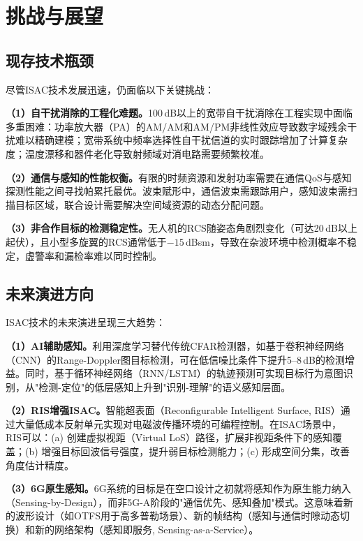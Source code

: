 \section{挑战与展望}

\subsection{现存技术瓶颈}

尽管ISAC技术发展迅速，仍面临以下关键挑战：

\textbf{（1）自干扰消除的工程化难题。}100\,dB以上的宽带自干扰消除在工程实现中面临多重困难：功率放大器（PA）的AM/AM和AM/PM非线性效应导致数字域残余干扰难以精确建模；宽带系统中频率选择性自干扰信道的实时跟踪增加了计算复杂度；温度漂移和器件老化导致射频域对消电路需要频繁校准。

\textbf{（2）通信与感知的性能权衡。}有限的时频资源和发射功率需要在通信QoS与感知探测性能之间寻找帕累托最优。波束赋形中，通信波束需跟踪用户，感知波束需扫描目标区域，联合设计需要解决空间域资源的动态分配问题。

\textbf{（3）非合作目标的检测稳定性。}无人机的RCS随姿态角剧烈变化（可达20\,dB以上起伏），且小型多旋翼的RCS通常低于$-15$\,dBsm，导致在杂波环境中检测概率不稳定，虚警率和漏检率难以同时控制。

\subsection{未来演进方向}

ISAC技术的未来演进呈现三大趋势：

\textbf{（1）AI辅助感知。}利用深度学习替代传统CFAR检测器，如基于卷积神经网络（CNN）的Range-Doppler图目标检测，可在低信噪比条件下提升5--8\,dB的检测增益。同时，基于循环神经网络（RNN/LSTM）的轨迹预测可实现目标行为意图识别，从"检测-定位"的低层感知上升到"识别-理解"的语义感知层面。

\textbf{（2）RIS增强ISAC。}智能超表面（Reconfigurable Intelligent Surface, RIS）通过大量低成本反射单元实现对电磁波传播环境的可编程控制。在ISAC场景中，RIS可以：(a) 创建虚拟视距（Virtual LoS）路径，扩展非视距条件下的感知覆盖；(b) 增强目标回波信号强度，提升弱目标检测能力；(c) 形成空间分集，改善角度估计精度。

\textbf{（3）6G原生感知。}6G系统的目标是在空口设计之初就将感知作为原生能力纳入（Sensing-by-Design），而非5G-A阶段的"通信优先、感知叠加"模式。这意味着新的波形设计（如OTFS用于高多普勒场景）、新的帧结构（感知与通信时隙动态切换）和新的网络架构（感知即服务, Sensing-as-a-Service）。

